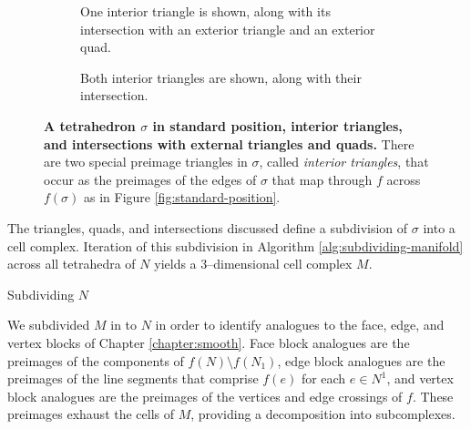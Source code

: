 \begin{figure}[h!]
	\begin{subfigure}[t]{0.45\textwidth}
		\caption{One interior triangle is shown, along with its intersection with an exterior triangle and an exterior quad.} \label{fig:standard-position-interior-exterior}
	\end{subfigure}
	\hfill
	\begin{subfigure}[t]{0.45\textwidth}
		\caption{Both interior triangles are shown, along with their intersection.} \label{fig:standard-position-interior-interior}
	\end{subfigure}
	
	\caption{
		\textbf{A tetrahedron $\sigma$ in standard position, interior triangles, and intersections with external triangles and quads.}
		There are two special preimage triangles in $\sigma$, called \emph{interior triangles}, that occur as the preimages of the edges of $\sigma$ that map through $f$ across $f(\sigma)$ as in Figure \ref{fig:standard-position}.
	}
	\label{fig:standard-position-interior}
\end{figure}

The triangles, quads, and intersections discussed define a subdivision of $\sigma$ into a cell complex.
Iteration of this subdivision in Algorithm \ref{alg:subdividing-manifold} across all tetrahedra of $N$ yields a 3--dimensional cell complex $M$.

\begin{algorithm}
	\caption{Subdividing $N$}
	\label{alg:subdividing-manifold}
\end{algorithm}

We subdivided $M$ in to $N$ in order to identify analogues to the face, edge, and vertex blocks of Chapter \ref{chapter:smooth}.
Face block analogues are the preimages of the components of $f(N)\setminus f(N_1)$, edge block analogues are the preimages of the line segments that comprise $f(e)$ for each $e\in N^1$, and vertex block analogues are the preimages of the vertices and edge crossings of $f$.
These preimages exhaust the cells of $M$, providing a decomposition into subcomplexes.

